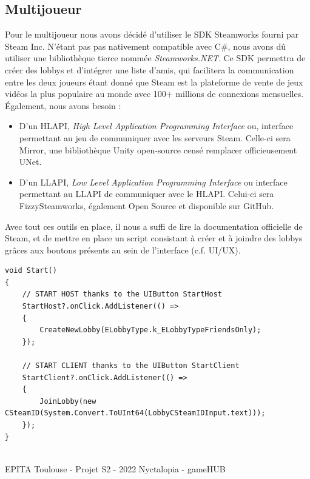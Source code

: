 \newpage

\subsection{Multijoueur}
\setlength{\parindent}{5ex}
Pour le multijoueur nous avons décidé d'utiliser le SDK Steamworks fourni par Steam Inc. N'étant pas pas nativement compatible avec C\#, nous avons dû utiliser une bibliothèque tierce nommée {\emph{Steamworks.NET}}. Ce SDK permettra de créer des lobbys et d'intégrer une liste d'amis, qui facilitera la communication entre les deux joueurs étant donné que Steam est la plateforme de vente de jeux vidéos la plus populaire au monde avec 100+ millions de connexions mensuelles. Également, nous avons besoin :

\begin{itemize}
    \item{ D'un HLAPI, \emph{High Level Application Programming Interface} ou, interface permettant au jeu de communiquer avec les serveurs Steam. Celle-ci sera Mirror, une bibliothèque Unity open-source censé remplacer officieusement UNet.}

    \item{ D'un LLAPI, \emph{Low Level Application Programming Interface} ou interface permettant au LLAPI de communiquer avec le HLAPI. Celui-ci sera FizzySteamworks, également Open Source et disponible sur GitHub.}
\end{itemize}


Avec tout ces outils en place, il nous a suffi de lire la documentation officielle de Steam, et de mettre en place un script consistant à créer et à joindre des lobbys grâces aux boutons présents au sein de l'interface (c.f. UI/UX).

\begin{lstlisting}[language={[Sharp]C}, caption={Fonction C\# UILinker permettant de créer et rejoindre un lobby}, label={ScriptUILinker}]
void Start()
{
    // START HOST thanks to the UIButton StartHost
    StartHost?.onClick.AddListener(() => 
    {
        CreateNewLobby(ELobbyType.k_ELobbyTypeFriendsOnly);
    });

    // START CLIENT thanks to the UIButton StartClient
    StartClient?.onClick.AddListener(() => 
    {
        JoinLobby(new CSteamID(System.Convert.ToUInt64(LobbyCSteamIDInput.text)));
    });
}
\end{lstlisting}

\vfill
\noindent\makebox[\linewidth]{\rule{.8\paperwidth}{.6pt}}\\[0.2cm]
EPITA Toulouse - Projet S2 - 2022 \hfill Nyctalopia - gameHUB
\noindent\makebox[\linewidth]{\rule{.8\paperwidth}{.6pt}}
\newpage

